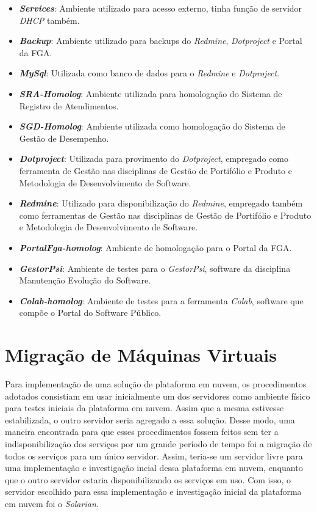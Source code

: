 \begin{apendicesenv}
\begin{itemize}
  \item \textbf{\textit{Services}}: Ambiente utilizado para acesso externo, tinha função de servidor \textit{DHCP} também.
  \item \textbf{\textit{Backup}}: Ambiente utilizado para backups do \textit{Redmine}, \textit{Dotproject} e Portal da FGA.
  \item \textbf{\textit{MySql}}: Utilizada como banco de dados para o \textit{Redmine} e \textit{Dotproject}.
  \item \textbf{\textit{SRA-Homolog}}: Ambiente utilizada para homologação do Sistema de Registro de Atendimentos.
  \item \textbf{\textit{SGD-Homolog}}: Ambiente utilizada como homologação do Sistema de Gestão de Desempenho.
  \item \textbf{\textit{Dotproject}}: Utilizada para provimento do \textit{Dotproject}, empregado como ferramenta de Gestão nas disciplinas de Gestão de Portifólio e Produto e Metodologia de Desenvolvimento de Software.
  \item \textbf{\textit{Redmine}}: Utilizado para disponibilização do \textit{Redmine}, empregado também como ferramentas de Gestão nas disciplinas de Gestão de Portifólio e Produto e Metodologia de Desenvolvimento de Software.
  \item \textbf{\textit{PortalFga-homolog}}: Ambiente de homologação para o Portal da FGA.
  \item \textbf{\textit{GestorPsi}}: Ambiente de testes para o \textit{GestorPsi}, software da disciplina Manutenção Evolução do Software.
  \item \textbf{\textit{Colab-homolog}}: Ambiente de testes para a ferramenta \textit{Colab}, software que compõe o Portal do Software Público.
\end{itemize}



\section{Migração de Máquinas Virtuais}
Para implementação de uma solução de plataforma em nuvem, os procedimentos adotados consistiam em usar inicialmente um dos servidores como ambiente físico  para testes iniciais da plataforma em nuvem. Assim que a mesma estivesse estabilizada, o outro servidor seria agregado a essa solução. Desse modo, uma maneira encontrada para que esses procedimentos fossem feitos sem ter a indisponibilização dos serviços por um grande período de tempo foi a migração de todos os serviços para um único servidor. Assim, teria-se um servidor livre para uma implementação e investigação incial dessa plataforma em nuvem, enquanto que o outro servidor estaria disponibilizando os serviços em uso. Com isso, o servidor escolhido para essa implementação e investigação inicial da plataforma em nuvem foi o \textit{Solarian}. 


\end{apendicesenv}
